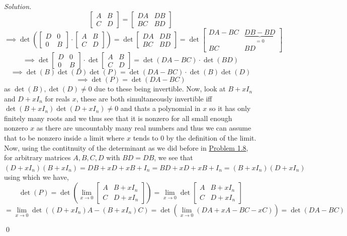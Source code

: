 \documentclass[12pt,a4paper]{article}
\newenvironment{solution}{%
  \par\noindent\textit{Solution.}\ }{\qed}
\theoremstyle{problemstyle}
\begin{document}
\begin{solution}
$$\begin{bmatrix}
        A & B\\ C & D
    \end{bmatrix}=\begin{bmatrix}
        DA & DB\\ BC & BD
    \end{bmatrix}$$
    $$\implies\det\left(\begin{bmatrix}
    D & 0 \\ 0 & B
    \end{bmatrix}\cdot\begin{bmatrix}
        A & B\\ C & D
    \end{bmatrix}\right)=\det\begin{bmatrix}
        DA & DB\\ BC & BD
    \end{bmatrix}=\det\begin{bmatrix}
        DA-BC & \underbrace{DB-BD}_{=0}\\ BC & BD
    \end{bmatrix}$$
    $$\implies\det\begin{bmatrix}
        D& 0\\ 0& B
    \end{bmatrix}\cdot\det\begin{bmatrix}
        A & B \\ C & D
    \end{bmatrix}=\det(DA-BC)\cdot\det(BD)$$
    $$\implies\det(B)\det(D)\det(P)=\det(DA-BC)\cdot\det(B)\det(D)$$
    $$\implies\det(P)=\det(DA-BC)$$
    as $\det(B),\det(D)\neq 0$ due to these being invertible. 
    Now, look at $B+xI_n$ and $D+xI_n$ for reals $x$, these are both simultaneously invertible iff $\det(B+xI_n)\det(D+xI_n)\neq 0$ and thats a polynomial in $x$ so it has only finitely many roots and we thus see that it is nonzero for all small enough nonzero $x$ as there are uncountably many real numbers and thus we can assume that to be nonzero inside a limit where $x$ tends to $0$ by the definition of the limit. 
    Now, using the contitnuity of the determinant as we did before in \hyperref[prob:1.8]{Problem 1.8}, for arbitrary matrices $A,B,C,D$ with $BD=DB$, we see that $(D+xI_n)(B+xI_n)=DB+xD+xB+I_n=BD+xD+xB+I_n=(B+xI_n)(D+xI_n)$ using which we have,
    $$\det(P)=\det\left(\lim_{x\to 0}\begin{bmatrix}
        A& B+xI_n\\ C& D+xI_n
    \end{bmatrix}\right)=\lim_{x\to 0}\det\begin{bmatrix}
        A& B+xI_n\\ C& D+xI_n
    \end{bmatrix}$$
    $$=\lim_{x\to 0}\det((D+xI_n)A-(B+xI_n)C)=\det\left(\lim_{x\to 0}(DA+xA-BC-xC)\right)=\det(DA-BC)$$

\end{solution}
\end{document}
